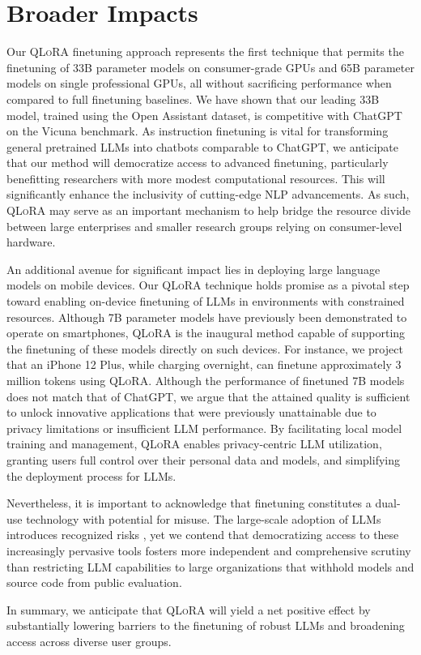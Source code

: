 \section{Broader Impacts}

Our \textsc{QLoRA} finetuning approach represents the first technique that permits the finetuning of 33B parameter models on consumer-grade GPUs and 65B parameter models on single professional GPUs, all without sacrificing performance when compared to full finetuning baselines. We have shown that our leading 33B model, trained using the Open Assistant dataset, is competitive with ChatGPT on the Vicuna benchmark. As instruction finetuning is vital for transforming general pretrained LLMs into chatbots comparable to ChatGPT, we anticipate that our method will democratize access to advanced finetuning, particularly benefitting researchers with more modest computational resources. This will significantly enhance the inclusivity of cutting-edge NLP advancements. As such, \textsc{QLoRA} may serve as an important mechanism to help bridge the resource divide between large enterprises and smaller research groups relying on consumer-level hardware.

An additional avenue for significant impact lies in deploying large language models on mobile devices. Our \textsc{QLoRA} technique holds promise as a pivotal step toward enabling on-device finetuning of LLMs in environments with constrained resources. Although 7B parameter models have previously been demonstrated to operate on smartphones, \textsc{QLoRA} is the inaugural method capable of supporting the finetuning of these models directly on such devices. For instance, we project that an iPhone 12 Plus, while charging overnight, can finetune approximately 3 million tokens using \textsc{QLoRA}. Although the performance of finetuned 7B models does not match that of ChatGPT, we argue that the attained quality is sufficient to unlock innovative applications that were previously unattainable due to privacy limitations or insufficient LLM performance. By facilitating local model training and management, \textsc{QLoRA} enables privacy-centric LLM utilization, granting users full control over their personal data and models, and simplifying the deployment process for LLMs.

Nevertheless, it is important to acknowledge that finetuning constitutes a dual-use technology with potential for misuse. The large-scale adoption of LLMs introduces recognized risks \citep{bommasani2021opportunities,bender2021dangers}, yet we contend that democratizing access to these increasingly pervasive tools fosters more independent and comprehensive scrutiny than restricting LLM capabilities to large organizations that withhold models and source code from public evaluation.

In summary, we anticipate that \textsc{QLoRA} will yield a net positive effect by substantially lowering barriers to the finetuning of robust LLMs and broadening access across diverse user groups.